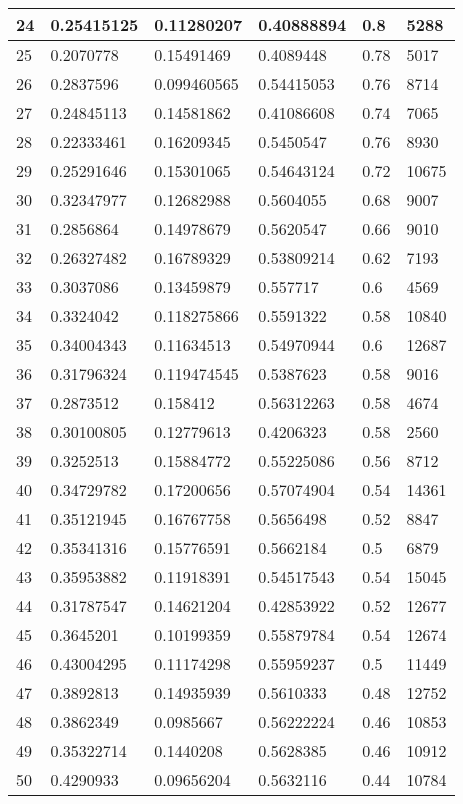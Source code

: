 \begin{longtable}{|l|l|l|l|l|l|}
24 & 0.25415125 & 0.11280207 & 0.40888894 & 0.8 & 5288 \\ \hline 
25 & 0.2070778 & 0.15491469 & 0.4089448 & 0.78 & 5017 \\ \hline 
26 & 0.2837596 & 0.099460565 & 0.54415053 & 0.76 & 8714 \\ \hline 
27 & 0.24845113 & 0.14581862 & 0.41086608 & 0.74 & 7065 \\ \hline 
28 & 0.22333461 & 0.16209345 & 0.5450547 & 0.76 & 8930 \\ \hline 
29 & 0.25291646 & 0.15301065 & 0.54643124 & 0.72 & 10675 \\ \hline 
30 & 0.32347977 & 0.12682988 & 0.5604055 & 0.68 & 9007 \\ \hline 
31 & 0.2856864 & 0.14978679 & 0.5620547 & 0.66 & 9010 \\ \hline 
32 & 0.26327482 & 0.16789329 & 0.53809214 & 0.62 & 7193 \\ \hline 
33 & 0.3037086 & 0.13459879 & 0.557717 & 0.6 & 4569 \\ \hline 
34 & 0.3324042 & 0.118275866 & 0.5591322 & 0.58 & 10840 \\ \hline 
35 & 0.34004343 & 0.11634513 & 0.54970944 & 0.6 & 12687 \\ \hline 
36 & 0.31796324 & 0.119474545 & 0.5387623 & 0.58 & 9016 \\ \hline 
37 & 0.2873512 & 0.158412 & 0.56312263 & 0.58 & 4674 \\ \hline 
38 & 0.30100805 & 0.12779613 & 0.4206323 & 0.58 & 2560 \\ \hline 
39 & 0.3252513 & 0.15884772 & 0.55225086 & 0.56 & 8712 \\ \hline 
40 & 0.34729782 & 0.17200656 & 0.57074904 & 0.54 & 14361 \\ \hline 
41 & 0.35121945 & 0.16767758 & 0.5656498 & 0.52 & 8847 \\ \hline 
42 & 0.35341316 & 0.15776591 & 0.5662184 & 0.5 & 6879 \\ \hline 
43 & 0.35953882 & 0.11918391 & 0.54517543 & 0.54 & 15045 \\ \hline 
44 & 0.31787547 & 0.14621204 & 0.42853922 & 0.52 & 12677 \\ \hline 
45 & 0.3645201 & 0.10199359 & 0.55879784 & 0.54 & 12674 \\ \hline 
46 & 0.43004295 & 0.11174298 & 0.55959237 & 0.5 & 11449 \\ \hline 
47 & 0.3892813 & 0.14935939 & 0.5610333 & 0.48 & 12752 \\ \hline 
48 & 0.3862349 & 0.0985667 & 0.56222224 & 0.46 & 10853 \\ \hline 
49 & 0.35322714 & 0.1440208 & 0.5628385 & 0.46 & 10912 \\ \hline 
50 & 0.4290933 & 0.09656204 & 0.5632116 & 0.44 & 10784 \\ \hline 
\end{longtable}